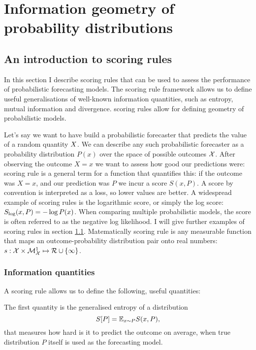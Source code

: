
\part{Information geometry of probability distributions}

\chapter{An introduction to scoring rules}

In this section I describe scoring rules that can be used to assess the performance of probabilistic forecasting models. The scoring rule framework allows us to define useful generalisations of well-known information quantities, such as entropy, mutual information and divergence.  scoring rules allow for defining geometry of probabilistic models.

Let's say we want to have build a probabilistic forecaster that predicts the value of a random quantity $X$. We can describe any such probabilistic forecaster as a probability distribution $P(x)$ over the space of possible outcomes $\mathcal{X}$. After observing the outcome $X=x$ we want to assess how good our predictions were: scoring rule is a general term for a function that quantifies this: if the outcome was $X=x$, and our prediction was $P$ we incur a score $S(x,P)$. A score by convention is interpreted as a loss, so lower values are better. A widespread example of scoring rules is the logarithmic score, or simply the log score: $S_{\log}(x,P) = -\log P(x)$. When comparing multiple probabilistic models, the score is often referred to as the negative log likelihood. I will give further examples of scoring rules in section \ref{}. Matematically scoring rule is any measurable function that maps an outcome-probability distribution pair onto real numbers: $s:\mathcal{X}\times\mathcal{M}^{1}_{\mathcal{X}}\mapsto\mathcal{R}\cup\{\infty\}$.

\section{Information quantities}
A scoring rule allows us to define the following, useful quantities:

The first quantity is the generalised entropy of a distribution
\begin{equation}
	S[P] = \mathbb{E}_{x\sim P} S(x,P)\mbox{,}
\end{equation}
that measures how hard is it to predict the outcome on average, when true distribution $P$ itself is used as the forecasting model.

